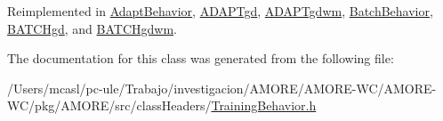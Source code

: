 Reimplemented in \hyperlink{class_adapt_behavior_a718cc9761a139f812db92583b658810b}{AdaptBehavior}, \hyperlink{class_a_d_a_p_tgd_a61a992390f1994694918254eb49226a8}{ADAPTgd}, \hyperlink{class_a_d_a_p_tgdwm_ae7aacd1009a935359982c0b78d87a990}{ADAPTgdwm}, \hyperlink{class_batch_behavior_a491c5129f7f66c6aa6978469338ca41f}{BatchBehavior}, \hyperlink{class_b_a_t_c_hgd_af595488bdd12a46087edbdab0385251a}{BATCHgd}, and \hyperlink{class_b_a_t_c_hgdwm_af53c2c70dcef41328bb405f2905fd2c9}{BATCHgdwm}.



The documentation for this class was generated from the following file:\begin{DoxyCompactItemize}
\item 
/Users/mcasl/pc-\/ule/Trabajo/investigacion/AMORE/AMORE-\/WC/AMORE-\/WC/pkg/AMORE/src/classHeaders/\hyperlink{_training_behavior_8h}{TrainingBehavior.h}\end{DoxyCompactItemize}
